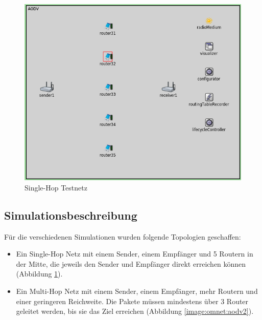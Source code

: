 \begin{figure}
  \centering
  \includegraphics[scale=0.45]{bilder/aodv1.png}
  \caption{Single-Hop Testnetz}
  \label{image:omnet:aodv1}
\end{figure}

\subsection{Simulationsbeschreibung}
\label{chapter:versuch:aufbau:sim}

Für die verschiedenen Simulationen wurden folgende Topologien geschaffen:

\begin{itemize}
\item Ein Single-Hop Netz mit einem Sender, einem Empfänger und 5 Routern in der Mitte, die jeweils den Sender und Empfänger direkt erreichen können (Abbildung \ref{image:omnet:aodv1}).
\item Ein Multi-Hop Netz mit einem Sender, einem Empfänger, mehr Routern und einer geringeren Reichweite. Die Pakete müssen mindestens über 3 Router geleitet werden, bis sie das Ziel erreichen (Abbildung \ref{image:omnet:aodv2}).
\end{itemize}

